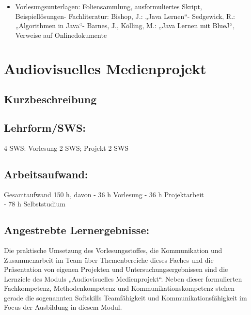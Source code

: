 \begin{itemize}
\tightlist
\item
  Vorlesungsunterlagen: Foliensammlung, ausformuliertes Skript,
  Beispiellösungen- Fachliteratur: Bishop, J.: „Java Lernen``-
  Sedgewick, R.: „Algorithmen in Java``- Barnes, J., Kölling, M.: „Java
  Lernen mit BlueJ``, Verweise auf Onlinedokumente
\end{itemize}

\chapter{Audiovisuelles
Medienprojekt}\label{audiovisuelles-medienprojekt}

\section{Kurzbeschreibung}\label{kurzbeschreibung}

\section{Lehrform/SWS:}\label{lehrformsws-2}

4 SWS: Vorlesung 2 SWS; Projekt 2 SWS

\section{Arbeitsaufwand:}\label{arbeitsaufwand-2}

Gesamtaufwand 150 h, davon - 36 h Vorlesung - 36 h Projektarbeit\\
- 78 h Selbststudium

\section{Angestrebte
Lernergebnisse:}\label{angestrebte-lernergebnisse-2}

Die praktische Umsetzung des Vorlesungsstoffes, die Kommunikation und
Zusammenarbeit im Team über Themenbereiche dieses Faches und die
Präsentation von eigenen Projekten und Untersuchungsergebnissen sind die
Lernziele des Moduls „Audiovisuelles Medienprojekt``. Neben dieser
formulierten Fachkompetenz, Methodenkompetenz und
Kommunikationskompetenz stehen gerade die sogenannten Softskills
Teamfähigkeit und Kommunikationsfähigkeit im Focus der Ausbildung in
diesem Modul.

